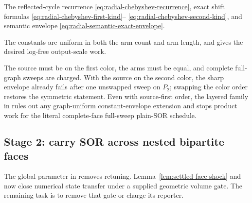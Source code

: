 \begin{description}[leftmargin=2.7cm,style=nextline]
\item[Deliverable]
The reflected-cycle recurrence
\eqref{eq:radial-chebyshev-recurrence}, exact shift formulas
\eqref{eq:radial-chebyshev-first-kind}--%
\eqref{eq:radial-chebyshev-second-kind}, and semantic envelope
\eqref{eq:radial-semantic-exact-envelope}.
\item[Result]
The constants are uniform in both the arm count and arm length, and
 gives the desired log-free output-scale
work.
\item[Scope guard]
The source must be on the first color, the arms must be equal, and complete
full-graph sweeps are charged.  With the source on the second color, the sharp
envelope already fails after one unswapped sweep on $P_2$; swapping the color
order restores the symmetric statement.  Even with source-first order, the
layered family in  rules out any
graph-uniform constant-envelope extension and
 stops product work for the literal
complete-face full-sweep plain-SOR schedule.
\end{description}

\subsection{Stage 2: carry SOR across nested bipartite faces}

The global parameter in  removes
retuning.  Lemma~\ref{lem:settled-face-shock} and
 now close numerical state transfer
under a supplied geometric volume gate.  The remaining task is to remove
that gate or charge its reporter.

